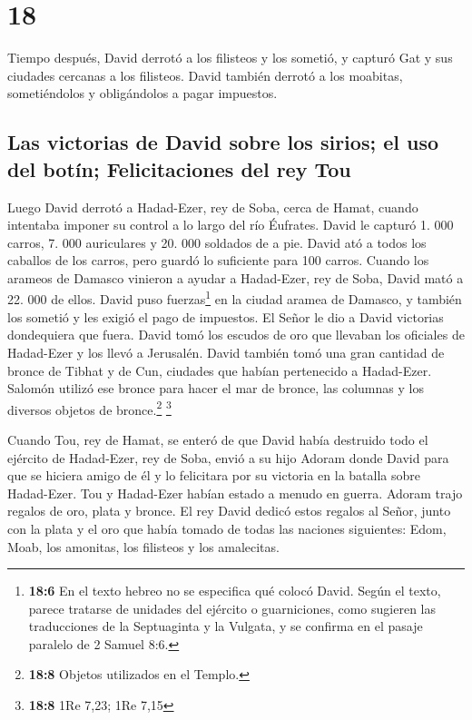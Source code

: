 \hypertarget{section-17}{%
\section{18}\label{section-17}}

 Tiempo después, David derrotó a los filisteos y los
sometió, y capturó Gat y sus ciudades cercanas a los filisteos.
 David también derrotó a los moabitas, sometiéndolos y
obligándolos a pagar impuestos.

\hypertarget{las-victorias-de-david-sobre-los-sirios-el-uso-del-botuxedn-felicitaciones-del-rey-tou}{%
\subsection{Las victorias de David sobre los sirios; el uso del botín;
Felicitaciones del rey
Tou}\label{las-victorias-de-david-sobre-los-sirios-el-uso-del-botuxedn-felicitaciones-del-rey-tou}}

 Luego David derrotó a Hadad-Ezer, rey de Soba, cerca de
Hamat, cuando intentaba imponer su control a lo largo del río Éufrates.
 David le capturó 1. 000 carros, 7. 000 auriculares y 20.
000 soldados de a pie. David ató a todos los caballos de los carros,
pero guardó lo suficiente para 100 carros.  Cuando los
arameos de Damasco vinieron a ayudar a Hadad-Ezer, rey de Soba, David
mató a 22. 000 de ellos.  David puso fuerzas\footnote{\textbf{18:6}
  En el texto hebreo no se especifica qué colocó David. Según el texto,
  parece tratarse de unidades del ejército o guarniciones, como sugieren
  las traducciones de la Septuaginta y la Vulgata, y se confirma en el
  pasaje paralelo de 2 Samuel 8:6.} en la ciudad aramea de Damasco, y
también los sometió y les exigió el pago de impuestos. El Señor le dio a
David victorias dondequiera que fuera.  David tomó los
escudos de oro que llevaban los oficiales de Hadad-Ezer y los llevó a
Jerusalén.  David también tomó una gran cantidad de bronce
de Tibhat y de Cun, ciudades que habían pertenecido a Hadad-Ezer.
Salomón utilizó ese bronce para hacer el mar de bronce, las columnas y
los diversos objetos de bronce.\footnote{\textbf{18:8} Objetos
  utilizados en el Templo.} \footnote{\textbf{18:8} 1Re 7,23; 1Re 7,15}

 Cuando Tou, rey de Hamat, se enteró de que David había
destruido todo el ejército de Hadad-Ezer, rey de Soba, 
envió a su hijo Adoram donde David para que se hiciera amigo de él y lo
felicitara por su victoria en la batalla sobre Hadad-Ezer. Tou y
Hadad-Ezer habían estado a menudo en guerra. Adoram trajo regalos de
oro, plata y bronce.  El rey David dedicó estos regalos
al Señor, junto con la plata y el oro que había tomado de todas las
naciones siguientes: Edom, Moab, los amonitas, los filisteos y los
amalecitas.

